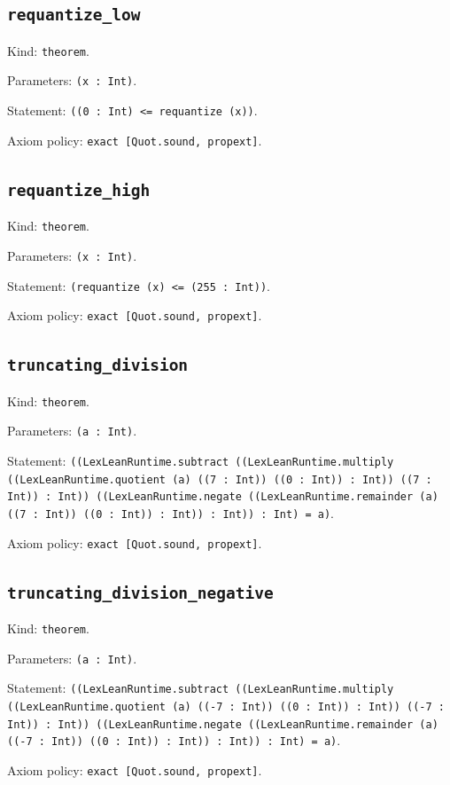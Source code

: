 \documentclass[11pt]{article}
\begin{document}
\subsection*{\texttt{requantize\_low}}
\noindent Kind: \texttt{theorem}.\par
\noindent Parameters: \texttt{(x : Int)}.\par
\noindent Statement: \texttt{((0 : Int) <= requantize (x))}.\par
\noindent Axiom policy: \texttt{exact [Quot.sound, propext]}.\par
\subsection*{\texttt{requantize\_high}}
\noindent Kind: \texttt{theorem}.\par
\noindent Parameters: \texttt{(x : Int)}.\par
\noindent Statement: \texttt{(requantize (x) <= (255 : Int))}.\par
\noindent Axiom policy: \texttt{exact [Quot.sound, propext]}.\par
\subsection*{\texttt{truncating\_division}}
\noindent Kind: \texttt{theorem}.\par
\noindent Parameters: \texttt{(a : Int)}.\par
\noindent Statement: \texttt{((LexLeanRuntime.subtract ((LexLeanRuntime.multiply ((LexLeanRuntime.quotient (a) ((7 : Int)) ((0 : Int)) : Int)) ((7 : Int)) : Int)) ((LexLeanRuntime.negate ((LexLeanRuntime.remainder (a) ((7 : Int)) ((0 : Int)) : Int)) : Int)) : Int) = a)}.\par
\noindent Axiom policy: \texttt{exact [Quot.sound, propext]}.\par
\subsection*{\texttt{truncating\_division\_negative}}
\noindent Kind: \texttt{theorem}.\par
\noindent Parameters: \texttt{(a : Int)}.\par
\noindent Statement: \texttt{((LexLeanRuntime.subtract ((LexLeanRuntime.multiply ((LexLeanRuntime.quotient (a) ((-7 : Int)) ((0 : Int)) : Int)) ((-7 : Int)) : Int)) ((LexLeanRuntime.negate ((LexLeanRuntime.remainder (a) ((-7 : Int)) ((0 : Int)) : Int)) : Int)) : Int) = a)}.\par
\noindent Axiom policy: \texttt{exact [Quot.sound, propext]}.\par
\end{document}
